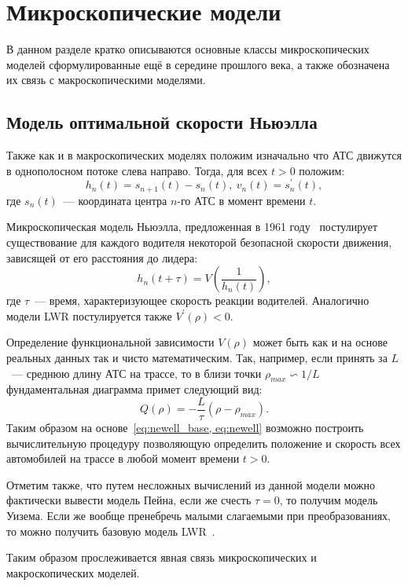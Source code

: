 \section{Микроскопические модели}\label{subsec:ch1/sec2}
В данном разделе кратко описываются основные классы микроскопических моделей сформулированные ещё в середине прошлого века, а также обозначена их связь с макроскопическими моделями.

\subsection{Модель оптимальной скорости Ньюэлла}\label{subsec:ch1/sec2/sub1}
Также как и в макроскопических моделях положим изначально что АТС движутся в однополосном потоке слева направо.
Тогда, для всех \(t>0\) положим:
\begin{equation}
    \label{eq:newell_base}
    h_n(t) = s_{n+1}(t) - s_n(t),\ v_n(t)=s_n^{'}(t),
\end{equation}
где \(s_n(t)\)~--- координата центра \(n\)-го АТС в момент времени \(t\).

Микроскопическая модель Ньюэлла, предложенная в 1961 году~\cite{newell1961nonlinear} постулирует существование для каждого водителя некоторой безопасной скорости движения, зависящей от его расстояния до лидера:
\begin{equation}\label{eq:newell}
  h_n(t+\tau) = V\left(\frac{1}{h_n(t)}\right),
\end{equation}
где \(\tau\)~--- время, характеризующее скорость реакции водителей.
Аналогично модели LWR постулируется также \(V^{'}(\rho) < 0\).

Определение функциональной зависимости \(V(\rho)\) может быть как и на основе реальных данных так и чисто математическим.
Так, например, если принять за \(L\)~--- среднюю длину АТС на трассе, то в близи точки \(\rho_{max} \backsim 1/L \) фундаментальная диаграмма примет следующий вид:
\[
    Q(\rho) = -\frac{L}{\tau}(\rho - \rho_{max}).
\]
Таким образом на основе~\ref{eq:newell_base, eq:newell} возможно построить вычислительную процедуру позволяющую определить положение и скорость всех автомобилей на трассе в любой момент времени \(t>0\).

Отметим также, что путем несложных вычислений из данной модели можно фактически вывести модель Пейна, если же счесть \(\tau=0\), то получим модель Уизема.
Если же вообще пренебречь малыми слагаемыми при преобразованиях, то можно получить базовую модель LWR~\cite{gasn2017introd}.

Таким образом прослеживается явная связь микроскопических и макроскопических моделей.


